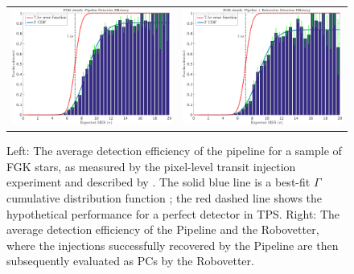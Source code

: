 \begin{figure}[ht]
\centering
\hspace{-2.5em}\begin{tabular}{cc}
\includegraphics[width=0.5\linewidth]{fig-senscurvwithfits_withoutRv-trimmed.png} &
\includegraphics[width=0.5\linewidth]{fig-senscurvwithfits_withRv-trimmed.png}
\end{tabular}
\caption{Left: The average detection efficiency of the pipeline for a sample of FGK stars, as measured by the pixel-level transit injection experiment and described by \citet{Christiansen2017}. The solid blue line is a best-fit $\Gamma$ cumulative distribution function \citep[see Equation 1 of ][]{Christiansen2016}; the red dashed line shows the hypothetical performance for a perfect detector in TPS. Right: The average detection efficiency of the \Kepler{} Pipeline and the Robovetter, where the injections successfully recovered by the Pipeline are then subsequently evaluated as PCs by the Robovetter.}

\label{f:fulldetectionefficiency}

\end{figure}


